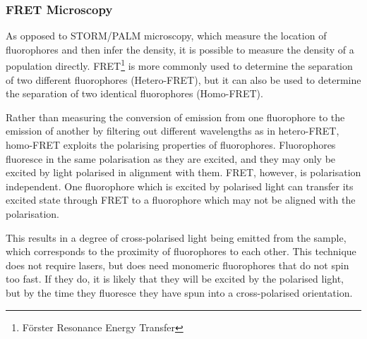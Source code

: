 \documentclass[../main.tex]{subfiles}
\begin{document}
\subsubsection{FRET Microscopy}
As opposed to STORM/PALM microscopy, which measure the location of fluorophores and then infer the density, it is possible to measure the density of a population directly. FRET\footnote{F\"orster Resonance Energy Transfer} is more commonly used to determine the separation of two different fluorophores (Hetero-FRET), but it can also be used to determine the separation of two identical fluorophores (Homo-FRET).

Rather than measuring the conversion of emission from one fluorophore to the emission of another by filtering out different wavelengths as in hetero-FRET, homo-FRET exploits the polarising properties of fluorophores. Fluorophores fluoresce in the same polarisation as they are excited, and they may only be excited by light polarised in alignment with them. FRET, however, is polarisation independent. One fluorophore which is excited by polarised light can transfer its excited state through FRET to a fluorophore which may not be aligned with the polarisation. 

This results in a degree of cross-polarised light being emitted from the sample, which corresponds to the proximity of fluorophores to each other. This technique does not require lasers, but does need monomeric fluorophores that do not spin too fast. If they do, it is likely that they will be excited by the polarised light, but by the time they fluoresce they have spun into a cross-polarised orientation. 
\end{document}
